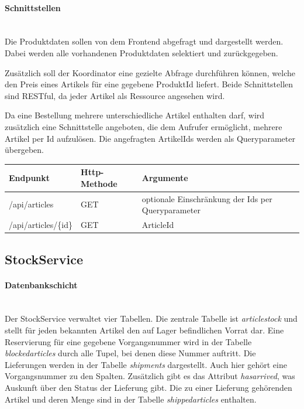 \paragraph*{Schnittstellen} \mbox{}\\
Die Produktdaten sollen von dem Frontend abgefragt und dargestellt werden. Dabei werden alle vorhandenen Produktdaten selektiert und zurückgegeben. 

Zusätzlich soll der Koordinator eine gezielte Abfrage durchführen können, welche den Preis eines Artikels für eine gegebene ProduktId liefert. Beide Schnittstellen sind RESTful, da jeder Artikel als Ressource angesehen wird. 

Da eine Bestellung mehrere unterschiedliche Artikel enthalten darf, wird zusätzlich eine Schnittstelle angeboten, die dem Aufrufer ermöglicht, mehrere Artikel per Id aufzulösen. Die angefragten ArtikelIds werden als Queryparameter übergeben.

\begin{center}
	\begin{tabular}[h]{|p{3.5cm}|p{3cm}|p{6cm}|}
		\hline
		Endpunkt & Http-Methode & Argumente \\ \hline
		/api/articles & GET & optionale Einschränkung der Ids per Queryparameter \\ \hline
		/api/articles/\{id\} & GET & ArticleId \\ \hline
	\end{tabular}
\end{center}
\FloatBarrier

\subsection{StockService}
\paragraph*{Datenbankschicht} \mbox{}\\

Der StockService verwaltet vier Tabellen. Die zentrale Tabelle ist \textit{articlestock} und stellt für jeden bekannten Artikel den auf Lager befindlichen Vorrat dar. Eine Reservierung für eine gegebene Vorgangsnummer wird in der Tabelle \textit{blockedarticles} durch alle Tupel, bei denen diese Nummer auftritt. Die Lieferungen werden in der Tabelle \textit{shipments} dargestellt. Auch hier gehört eine Vorgangsnummer zu den Spalten. Zusätzlich gibt es das Attribut \textit{hasarrived}, was Auskunft über den Status der Lieferung gibt. Die zu einer Lieferung gehörenden Artikel und deren Menge sind in der Tabelle \textit{shippedarticles} enthalten.

